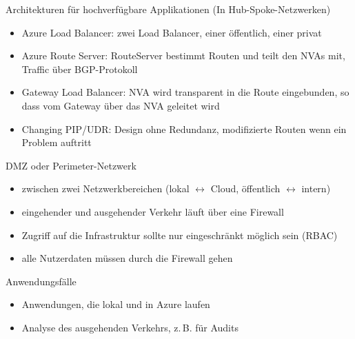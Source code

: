 \begin{flashcard}[]{Architekturen für hochverfügbare Applikationen}
  (In Hub-Spoke-Netzwerken)
  \begin{itemize}
    \item Azure Load Balancer:\newline
      zwei Load Balancer, einer öffentlich, einer privat
    \item Azure Route Server:\newline
      RouteServer bestimmt Routen und teilt den NVAs mit, Traffic über BGP-Protokoll
    \item Gateway Load Balancer:\newline
      NVA wird transparent in die Route eingebunden, so dass vom Gateway über das NVA geleitet wird
    \item Changing PIP/UDR:\newline
      Design ohne Redundanz, modifizierte Routen wenn ein Problem auftritt
  \end{itemize}
\end{flashcard}

\begin{flashcard}[]{DMZ oder Perimeter-Netzwerk}
  \begin{itemize}
    \item zwischen zwei Netzwerkbereichen (lokal $\leftrightarrow$ Cloud, öffentlich $\leftrightarrow$ intern)
    \item eingehender und ausgehender Verkehr läuft über eine Firewall
    \item Zugriff auf die Infrastruktur sollte nur eingeschränkt möglich sein (RBAC)
    \item alle Nutzerdaten müssen durch die Firewall gehen
  \end{itemize}
\end{flashcard}

\begin{flashcard}[]{Anwendungsfälle}
  \begin{itemize}
    \item Anwendungen, die lokal und in Azure laufen
    \item Analyse des ausgehenden Verkehrs, z.\,B. für Audits
  \end{itemize}
\end{flashcard}

